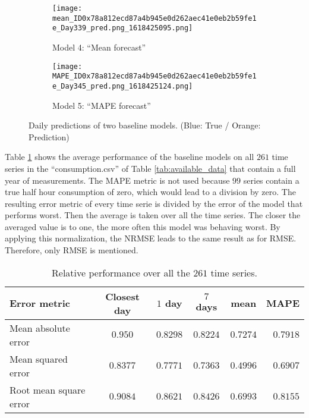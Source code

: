 \begin{figure}[ht]
	\begin{subfigure}{0.5\textwidth}
		\texttt{[image: mean\_ID0x78a812ecd87a4b945e0d262aec41e0eb2b59fe1e\_Day339\_pred.png\_1618425095.png]}
		\caption{Model 4: ``Mean forecast''}
	\end{subfigure}	
	\begin{subfigure}{0.5\textwidth}
		\texttt{[image: MAPE\_ID0x78a812ecd87a4b945e0d262aec41e0eb2b59fe1e\_Day345\_pred.png\_1618425124.png]}
		\caption{Model 5: ``MAPE forecast''}
	\end{subfigure}
	\caption{Daily predictions of two baseline models. (Blue: True / Orange: Prediction) }
	\label{fig:baseline models 4 and 5}
\end{figure}


Table \ref{tab:summ_data_rel_performance} shows the average performance of the baseline models on all $ 261 $ time series in the ``consumption.csv'' of Table \ref{tab:available_data} that contain a full year of measurements. The MAPE metric is not used because $ 99 $ series contain a true half hour consumption of zero, which would lead to a division by zero. The resulting error metric of every time serie is divided by the error of the model that performs worst. Then the average is taken over all the time series. The closer the averaged value is to one, the more often this model was behaving worst. By applying this normalization, the NRMSE leads to the same result as for RMSE. Therefore, only RMSE is mentioned. 

\begin{table}[ht]
	\centering
	\begin{tabular}{@{}l|ccccr@{}} \toprule
		\textbf{Error metric}	& \textbf{Closest day} & \textbf{$ 1 $ day} & \textbf{$ 7 $ days} & \textbf{mean} & \textbf{MAPE}\\\midrule
		Mean absolute error& \cellcolor{red!25}$0.950 $&$ 0.8298 $  & $0.8224 $ & \cellcolor{green!25}$ 0.7274 $ & $ 0.7918 $\\
		Mean squared error& \cellcolor{red!25}$0.8377 $&$ 0.7771 $  & $0.7363 $ & \cellcolor{green!25}$ 0.4996 $ & $ 0.6907 $\\
		Root mean square error& \cellcolor{red!25}$0.9084 $&$ 0.8621$  & $0.8426$ & \cellcolor{green!25}$ 0.6993$ & $ 0.8155$\\\bottomrule
	\end{tabular}
	\caption{Relative performance over all the $ 261 $ time series.}
	\label{tab:summ_data_rel_performance}
\end{table}

